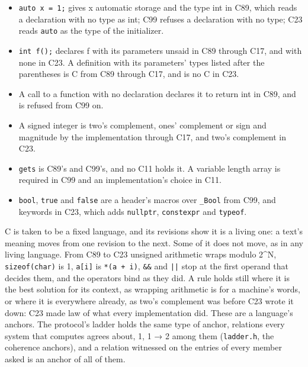\begin{itemize}
\item \texttt{auto x = 1;} gives x automatic storage and the type int in C89, which reads a declaration with no type as int; C99 refuses a declaration with no type; C23 reads \texttt{auto} as the type of the initializer.
\item \texttt{int f();} declares f with its parameters unsaid in C89 through C17, and with none in C23. A definition with its parameters' types listed after the parentheses is C from C89 through C17, and is no C in C23.
\item A call to a function with no declaration declares it to return int in C89, and is refused from C99 on.
\item A signed integer is two's complement, ones' complement or sign and magnitude by the implementation through C17, and two's complement in C23.
\item \texttt{gets} is C89's and C99's, and no C11 holds it. A variable length array is required in C99 and an implementation's choice in C11.
\item \texttt{bool}, \texttt{true} and \texttt{false} are a header's macros over \texttt{\_\allowbreak{}Bool} from C99, and keywords in C23, which adds \texttt{nullptr}, \texttt{constexpr} and \texttt{typeof}.
\end{itemize}

C is taken to be a fixed language, and its revisions show it is a living one: a text's meaning moves from one revision to the next. Some of it does not move, as in any living language. From C89 to C23 unsigned arithmetic wraps modulo 2\textasciicircum{}N, \texttt{sizeof(char)} is 1, \texttt{a[i]} is \texttt{*(a + i)}, \texttt{\&\&} and \texttt{||} stop at the first operand that decides them, and the operators bind as they did. A rule holds still where it is the best solution for its context, as wrapping arithmetic is for a machine's words, or where it is everywhere already, as two's complement was before C23 wrote it down: C23 made law of what every implementation did. These are a language's anchors. The protocol's ladder holds the same type of anchor, relations every system that computes agrees about, 1, 1 → 2 among them (\texttt{ladder.\allowbreak{}h}, the coherence anchors), and a relation witnessed on the entries of every member asked is an anchor of all of them.

